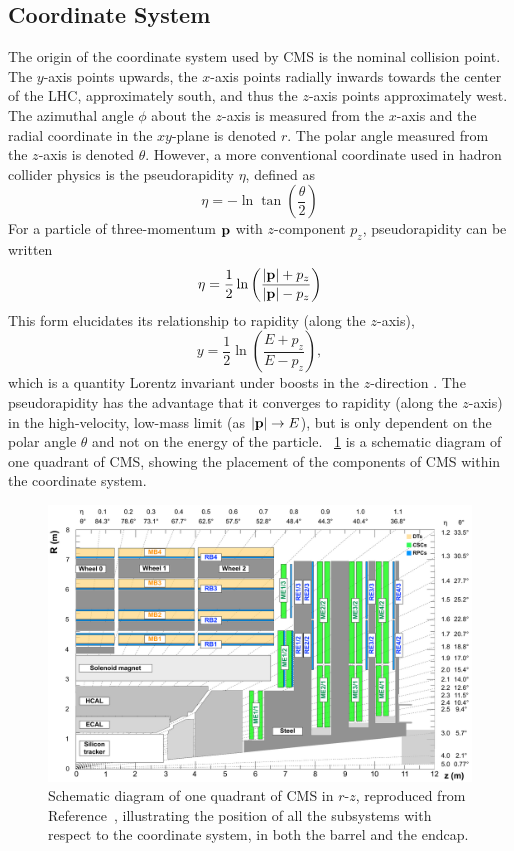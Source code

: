 \subsection{Coordinate System}
The origin of the coordinate system used by CMS is the nominal \pp collision point.
The $y$-axis points upwards, the $x$-axis points radially inwards towards the center of the LHC, approximately south, and thus the $z$-axis points approximately west.
The azimuthal angle $\phi$ about the $z$-axis is measured from the $x$-axis and the radial coordinate in the $xy$-plane is denoted $r$.
The polar angle measured from the $z$-axis is denoted $\theta$.
However, a more conventional coordinate used in hadron collider physics is the pseudorapidity $\eta$, defined as
\begin{equation}
  \eta = -\ln\tan\left(\frac{\theta}{2}\right)
  \label{eq:eta}
\end{equation}
For a particle of three-momentum $\mathbf{p}$ with $z$-component $p_z$, pseudorapidity can be written
\begin{equation}
  \eta = \frac12\ln\left(\frac{|\mathbf{p}|+p_z}{|\mathbf{p}|-p_z}\right)
  \label{eq:eta_p}
\end{equation}
This form elucidates its relationship to rapidity (along the $z$-axis),
\begin{equation}
  y = \frac12\ln\left(\frac{E+p_z}{E-p_z}\right),
  \label{eq:rap}
\end{equation}
which is a quantity Lorentz invariant under boosts in the $z$-direction \cite{Hama:1981}.
The pseudorapidity has the advantage that it converges to rapidity (along the $z$-axis) in the high-velocity, low-mass limit (as $|\mathbf{p}|\to E$), but is only dependent on the polar angle $\theta$ and not on the energy of the particle.
\Fig~\ref{cms:quadrant} is a schematic diagram of one quadrant of CMS, showing the placement of the components of CMS within the coordinate system.
\begin{figure}[tpb]
  \centering
  \includegraphics[width=\textwidth]{figures/cms/CMSGeometry.pdf}
  \caption{Schematic diagram of one quadrant of CMS in $r$-$z$, reproduced from Reference~\cite{Sirunyan:2018fpa}, illustrating the position of all the subsystems with respect to the coordinate system, in both the barrel and the endcap.}
  \label{cms:quadrant}
\end{figure}

